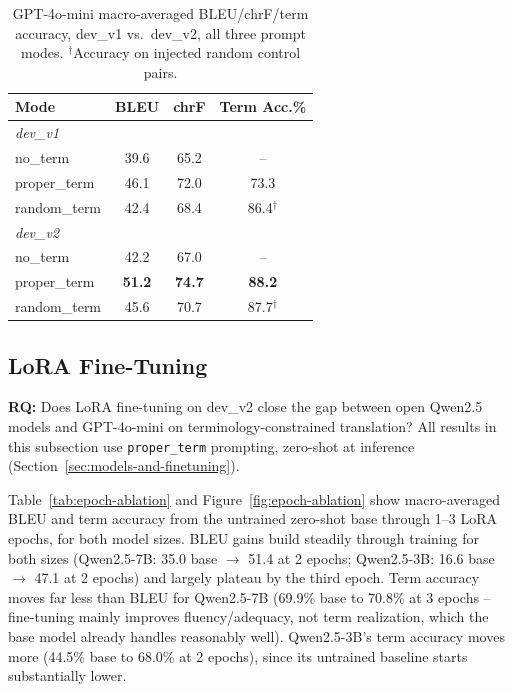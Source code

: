 \documentclass[11pt]{article}
\begin{document}
\begin{table}[t]
  \centering
  \small
  \begin{tabular}{lccc}
    \hline
    \textbf{Mode} & \textbf{BLEU} & \textbf{chrF} & \textbf{Term Acc.\%} \\
    \hline
    \multicolumn{4}{l}{\emph{dev\_v1}} \\
    no\_term     & 39.6 & 65.2 & -- \\
    proper\_term & 46.1 & 72.0 & 73.3 \\
    random\_term & 42.4 & 68.4 & 86.4$^\dagger$ \\
    \hline
    \multicolumn{4}{l}{\emph{dev\_v2}} \\
    no\_term     & 42.2 & 67.0 & -- \\
    proper\_term & \textbf{51.2} & \textbf{74.7} & \textbf{88.2} \\
    random\_term & 45.6 & 70.7 & 87.7$^\dagger$ \\
    \hline
  \end{tabular}
  \caption{GPT-4o-mini macro-averaged BLEU/chrF/term accuracy, dev\_v1 vs.\ dev\_v2, all three prompt modes. $^\dagger$Accuracy on injected random control pairs.}
  \label{tab:dev-comparison}
\end{table}

\subsection{LoRA Fine-Tuning}
\label{sec:exp-lora}

\textbf{RQ:} Does LoRA fine-tuning on dev\_v2 close the gap between open Qwen2.5 models and GPT-4o-mini on terminology-constrained translation? All results in this subsection use \texttt{proper\_term} prompting, zero-shot at inference (Section~\ref{sec:models-and-finetuning}).

Table~\ref{tab:epoch-ablation} and Figure~\ref{fig:epoch-ablation} show macro-averaged BLEU and term accuracy from the untrained zero-shot base through 1--3 LoRA epochs, for both model sizes. BLEU gains build steadily through training for both sizes (Qwen2.5-7B: 35.0 base $\to$ 51.4 at 2 epochs; Qwen2.5-3B: 16.6 base $\to$ 47.1 at 2 epochs) and largely plateau by the third epoch. Term accuracy moves far less than BLEU for Qwen2.5-7B (69.9\% base to 70.8\% at 3 epochs -- fine-tuning mainly improves fluency/adequacy, not term realization, which the base model already handles reasonably well). Qwen2.5-3B's term accuracy moves more (44.5\% base to 68.0\% at 2 epochs), since its untrained baseline starts substantially lower.
\end{document}
